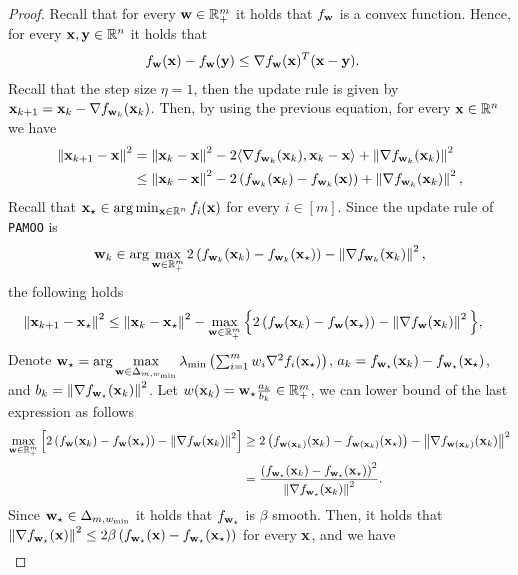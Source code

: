 \begin{proof}
Recall that for every $\w\in \reals^m_+$ it holds that $f_{\w}$ is a convex function. Hence, for every $\x,\y \in \reals^n$ it holds that
\begin{align*}
    &f_{\w}(\x) - f_{\w}(\y)  \leq \nabla f_\w(\x)^T(\x-\y). 
\end{align*}
Recall that the step size $\eta = 1$, then the update rule is given by $\x_{k+1} = \x_k - \nabla f_{\w_k}(\x_k)$. Then, by using the previous equation, for every $\x \in \reals^n$ we have
\begin{align}
    \enorm{\x_{k+1}-\x}^2 &=\enorm{\x_k-\x}^2 - 2\inner{\nabla f_{\w_k}(\x_k)}{\x_k - \x} + \enorm{\nabla f_{\w_k}(\x_k)}^2 \nonumber\\
    &\leq \enorm{\x_k-\x}^2 - 2 \brac{f_{\w_k}(\x_k)- f_{\w_k} (\x)} +\enorm{\nabla f_{\w_k}(\x_k)}^2 , \label{eq:PAMOO_dist_from_x}
\end{align}
Recall that $\x_\star \in \argmin_{\x \in \reals^n} f_i(\x)$ for every $i \in [m]$. Since the update rule of \texttt{PAMOO} is 
$$
\w_k\in \argmax_{\w\in \reals^m_+} 2\brac{f_{\w_k}(\x_k)- f_{\w_k} (\x_\star)} - \enorm{\nabla f_{\w_k}(\x_k)}^2,
$$
the following holds
\begin{align}
    \enorm{\x_{k+1}-\x_\star}^2 &\leq \enorm{\x_k-\x_\star}^2 -  \max_{\w \in \reals_+^m} \Big{\{} 2\brac{f_{\w}(\x_k)- f_{\w} (\x_\star)} - \enorm{\nabla f_{\w}(\x_k)}^2 \Big{\}}, \label{eq:PAMOO_dist_from_opt}
\end{align}
Denote $\w_\star = \argmax\limits_{\w\in \Delta_{m,\wmin}} \lambda_{\min}\brac{\sum_{i=1}^m w_i \nabla^2 f_i(\x_\star)}$, $a_k = f_{\w_\star}(\x_k)- f_{\w_\star} (\x_\star)$, and $b_k = \enorm{\nabla f_{\w_\star}(\x_k)}^2$. Let $w(\x_k) = \w_\star \frac{a_k}{b_k} \in \reals^m_+$, we can lower bound of the last expression as follows
\begin{align*}
    \max_{\w\in \reals_+^m} \left[ 2\brac{f_{\w}(\x_k)- f_{\w} (\x_\star)} - \enorm{\nabla f_{\w}(\x_k)}^2 \right] & \geq 2\brac{f_{\w(\x_k)}(\x_k)- f_{\w(\x_k)} (\x_\star)}  -\enorm{\nabla f_{\w(\x_k)}(\x_k)}^2 \\
    & =   \frac{\brac{f_{\w_\star}(\x_k)- f_{\w_\star} (\x_\star)}^2}{\enorm{\nabla f_{\w_\star}(\x_k)}^2}.
\end{align*}
Since $\w_\star\in \Delta_{m,\wmin}$ it holds that $f_{\w_\star}$ is $\beta$ smooth. Then, it holds that $\enorm{\nabla f_{\w_\star}(\x)}^2 \leq 2\beta \brac{f_{\w_\star}(\x)- f_{\w_\star} (\x_\star)}$ for every $\x$, and we have
\begin{align*}

\end{align*}
\end{proof}

